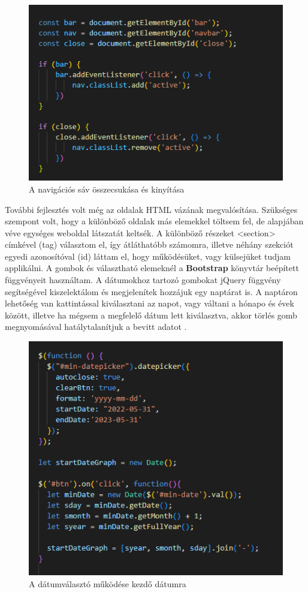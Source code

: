 \begin{figure}[h]
\centering
\includegraphics[scale=0.8]{images/navbarFunction.png}
\caption{A navigációs sáv összecsukása és kinyítása}
\label{fig:navbarfunc}
\end{figure}

További fejlesztés volt még az oldalak HTML vázának megvalósítása. Szükséges szempont volt, hogy a különböző oldalak más elemekkel töltsem fel, de alapjában véve egységes weboldal látszatát keltsék. A különböző részeket <section> címkével (tag) választom el, így átláthatóbb számomra, illetve néhány szekciót egyedi azonosítóval (id) láttam el, hogy működésüket, vagy külsejüket tudjam applikálni. A gombok és választható elemeknél a \textbf{Bootstrap} könyvtár beépített függvényeit használtam. A dátumokhoz tartozó gombokat jQuery függvény segítségével kiszelektálom és megjelenítek hozzájuk egy naptárat is. A naptáron lehetőség van kattintással kiválasztani az napot, vagy váltani a hónapo és évek között, illetve ha mégsem a megfelelő dátum lett kiválasztva, akkor törlés gomb megnyomásával hatálytalanítjuk a bevitt adatot .

\begin{figure}[h]
\centering
\includegraphics[scale=0.7]{images/datepicker.png}
\caption{A dátumválasztó működése kezdő dátumra}
\label{fig:datepicker}
\end{figure}

